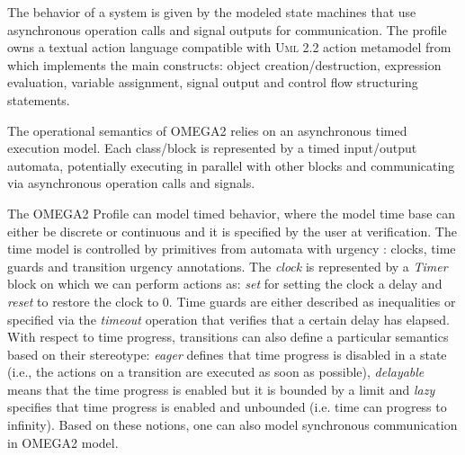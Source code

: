 \documentclass[a4paper,twoside]{article}
\def\uml{\textsc{Uml}}
\begin{document}

The behavior of a system is given by the modeled state machines that use asynchronous operation calls and signal outputs for communication. The profile owns a textual action language compatible with \uml{} 2.2 action metamodel from which implements the main constructs: object creation/destruction, expression evaluation, variable assignment, signal output and control flow structuring statements.


The operational semantics of OMEGA2 relies on an asynchronous timed execution model. Each class/block is represented by a timed input/output automata, potentially executing in parallel with other blocks and communicating via asynchronous operation calls and signals. 

The OMEGA2 Profile can model timed behavior, where the model time base can either be discrete or continuous and it is specified by the user at verification. The time model is controlled by primitives from automata with urgency \cite{test14}: clocks, time guards and transition urgency annotations. The \textit{clock} is represented by a \textit{Timer} block on which we can perform actions as: \textit{set} for setting the clock a delay and \textit{reset} to restore the clock to 0. Time guards are either described as inequalities or specified via the \textit{timeout} operation  that verifies that a certain delay has elapsed. With respect to time progress, transitions can also define a particular semantics based on their stereotype: \textit{eager} defines that time progress is disabled in a state (i.e., the actions on a transition are executed as soon as possible), \textit{delayable} means that the time progress is enabled but it is bounded by a limit and \textit{lazy} specifies that time progress is enabled and unbounded (i.e. time can progress to infinity). Based on these notions, one can also model synchronous communication in OMEGA2 model.

\end{document}
